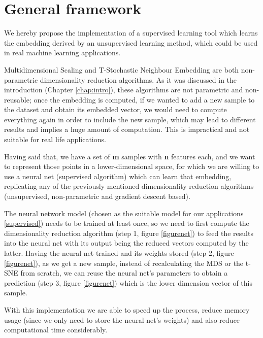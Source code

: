 \documentclass[a4paper,11pt,spanish]{report}
\begin{document}
\section{General framework}
\label{gframe}

We hereby propose the implementation of a supervised learning tool which learns the embedding derived by an unsupervised learning method, which could be used in real machine learning applications.

Multidimensional Scaling and T-Stochastic Neighbour Embedding are both non-parametric dimensionality reduction algorithms. As it was discussed in the introduction (Chapter \ref{chap:intro}), these algorithms are not parametric and  non-reusable; once the embedding is computed, if we wanted to add a new sample to the dataset and obtain its embedded vector, we would need to compute everything again in order to include the new sample, which may lead to different results and implies a huge amount of computation. This is impractical and not suitable for real life applications.

Having said that, we have a set of \textbf{m} samples with \textbf{n} features each, and we want to represent those points in a lower-dimensional space, for which we are willing to use a neural net (supervised algorithm) which can learn that embedding, replicating any of the previously mentioned dimensionality reduction algorithms (unsupervised, non-parametric and gradient descent based).

The neural network model (chosen as the suitable model for our applications \ref{supervised}) needs to be trained at least once, so we need to first compute the dimensionality reduction algorithm (step 1, figure \ref{figurenet}) to feed the results into the neural net with its output being the reduced vectors computed by the latter. Having the neural net trained and its weights stored (step 2, figure \ref{figurenet}), as we get a new sample, instead of recalculating the MDS or the t-SNE from scratch, we can reuse the neural net's parameters to obtain a prediction (step 3, figure \ref{figurenet}) which is the lower dimension vector of this sample.

With this implementation we are able to speed up the process, reduce memory usage (since we only need to store the neural net's weights) and also reduce computational time considerably.

\vspace{25px}
\end{document}
